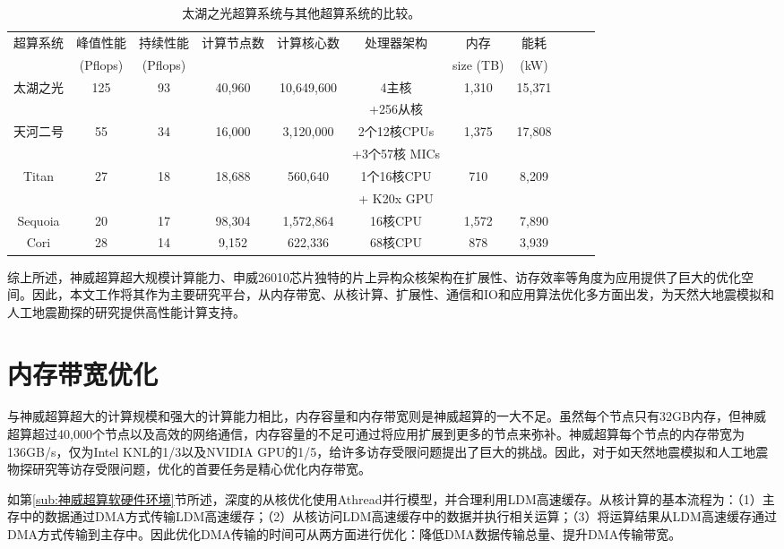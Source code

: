\documentclass[degree=doctor]{thuthesis}
\begin{document}
\begin{table}[ht]
\footnotesize
\caption{太湖之光超算系统与其他超算系统的比较。}
\label{tb:system-comp}
\begin{tabular*}{\textwidth}{ccccccccccc}
\hline\hline
  超算系统 & 峰值性能 & 持续性能 & 计算节点数 & 计算核心数 & 处理器架构 & 内存 & 能耗\\
  & (Pflops) & (Pflops) &&&& size (TB) & (kW)\\\hline
  太湖之光 & 125  & 93 & 40,960 & 10,649,600 & 4主核 & 1,310 & 15,371 \\
  & & & & & +256从核 \\\hline
  天河二号 & 55 & 34 & 16,000 & 3,120,000 & 2个12核CPUs & 1,375 & 17,808\\
  & & & & & +3个57核 MICs \\\hline
  Titan & 27 & 18 & 18,688 & 560,640 & 1个16核CPU & 710 & 8,209 \\
  & & & & &+ K20x GPU \\\hline
  Sequoia & 20 & 17 & 98,304 & 1,572,864 & 16核CPU & 1,572 & 7,890 \\\hline
  Cori & 28 & 14 & 9,152 & 622,336 & 68核CPU & 878 & 3,939\\\hline
\hline
\end{tabular*}
\end{table}

综上所述，神威超算超大规模计算能力、申威26010芯片独特的片上异构众核架构在扩展性、访存效率等角度为应用提供了巨大的优化空间。因此，本文工作将其作为主要研究平台，从内存带宽、从核计算、扩展性、通信和IO和应用算法优化多方面出发，为天然大地震模拟和人工地震勘探的研究提供高性能计算支持。

\section{内存带宽优化}
\label{sec:内存带宽优化}

与神威超算超大的计算规模和强大的计算能力相比，内存容量和内存带宽则是神威超算的一大不足。虽然每个节点只有32GB内存，但神威超算超过40,000个节点以及高效的网络通信，内存容量的不足可通过将应用扩展到更多的节点来弥补。神威超算每个节点的内存带宽为136GB/s，仅为Intel KNL的1/3以及NVIDIA GPU的1/5，给许多访存受限问题提出了巨大的挑战。因此，对于如天然地震模拟和人工地震物探研究等访存受限问题，优化的首要任务是精心优化内存带宽。

如第\ref{sub:神威超算软硬件环境}节所述，深度的从核优化使用Athread并行模型，并合理利用LDM高速缓存。从核计算的基本流程为：（1）主存中的数据通过DMA方式传输LDM高速缓存；（2）从核访问LDM高速缓存中的数据并执行相关运算；（3）将运算结果从LDM高速缓存通过DMA方式传输到主存中。因此优化DMA传输的时间可从两方面进行优化：降低DMA数据传输总量、提升DMA传输带宽。
\end{document}
